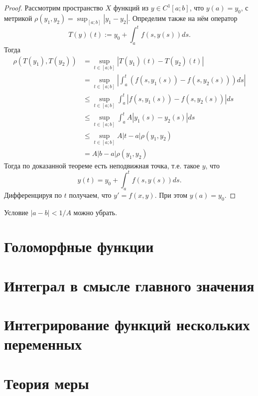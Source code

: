 \documentclass[12pt,a4paper]{article}
\begin{document}
    \begin{proof}
        Рассмотрим пространство $X$ функций из $y \in C^1[a; b]$, что $y(a) = y_0$, с метрикой $\rho(y_1, y_2) = \sup_{[a; b]} |y_1 - y_2|$. Определим также на нём оператор
        \[T(y)(t) := y_0 + \int_a^t f(s, y(s)) ds.\]
        Тогда
        \begin{align*}
            \rho(T(y_1), T(y_2))
            &= \sup_{t \in [a; b]} |T(y_1)(t) - T(y_2)(t)|\\
            &= \sup_{t \in [a; b]} \left|\int_a^t (f(s, y_1(s)) - f(s, y_2(s))) ds\right|\\
            &\leqslant \sup_{t \in [a; b]} \int_a^t |f(s, y_1(s)) - f(s, y_2(s))| ds\\
            &\leqslant \sup_{t \in [a; b]} \int_a^t A|y_1(s) - y_2(s)| ds\\
            &\leqslant \sup_{t \in [a; b]} A|t-a|\rho(y_1, y_2)\\
            &= A|b-a|\rho(y_1, y_2)
        \end{align*}
        Тогда по доказанной теореме есть неподвижная точка, т.е. такое $y$, что
        \[y(t) = y_0 + \int_a^t f(s, y(s)) ds.\]
        Дифференцируя по $t$ получаем, что $y' = f(x, y)$. При этом $y(a) = y_0$.
    \end{proof}

    \begin{corollary}
        Условие $|a-b| < 1/A$ можно убрать.
    \end{corollary}

    \section{Голоморфные функции}


    \section{Интеграл в смысле главного значения}

    
    \section{Интегрирование функций нескольких переменных}

    \newpage\null\thispagestyle{empty}\newpage
    \section{Теория меры}
\end{document}
